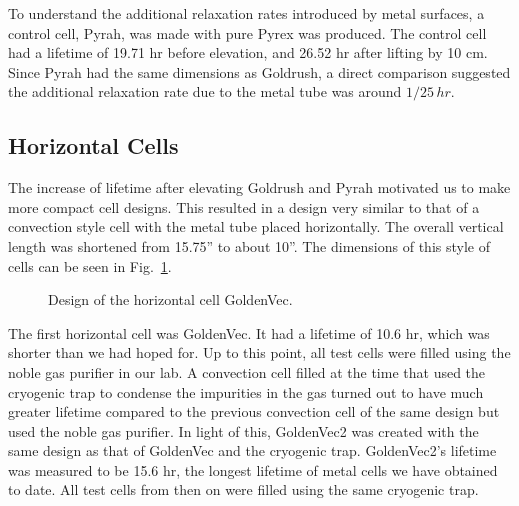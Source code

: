 To understand the additional relaxation rates introduced by metal surfaces, a control cell, Pyrah, was made with pure Pyrex was produced. The control cell had a lifetime of 19.71 hr before elevation, and 26.52 hr after lifting by 10 cm. Since Pyrah had the same dimensions as Goldrush, a direct comparison suggested the additional relaxation rate due to the metal tube was around $1/25\,hr$.

\subsection{Horizontal Cells}

The increase of lifetime after elevating Goldrush and Pyrah motivated us to make more compact cell designs. This resulted in a design very similar to that of a convection style cell with the metal tube placed horizontally. The overall vertical length was shortened from 15.75'' to about 10''. The dimensions of this style of cells can be seen in Fig.~\ref{goldenvec}.

\begin{figure}[t!]
	\centering
	\caption{{Design of the horizontal cell GoldenVec.}}
	\label{goldenvec}
\end{figure}

The first horizontal cell was GoldenVec. It had a lifetime of 10.6 hr, which was shorter than we had hoped for. Up to this point, all test cells were filled using the noble gas purifier in our lab. A convection cell filled at the time that used the cryogenic trap to condense the impurities in the gas turned out to have much greater lifetime compared to the previous convection cell of the same design but used the noble gas purifier. In light of this, GoldenVec2 was created with the same design as that of GoldenVec and the cryogenic trap. GoldenVec2's lifetime was measured to be 15.6 hr, the longest lifetime of metal cells we have obtained to date. All test cells from then on were filled using the same cryogenic trap.

